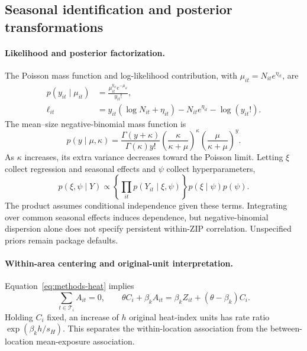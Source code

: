 \documentclass[11pt,letterpaper]{article}
\begin{document}
\subsection{Seasonal identification and posterior transformations}
\label{supp:posterior}
\paragraph{Likelihood and posterior factorization.}
The Poisson mass function and log-likelihood contribution, with \(\mu_{it}=N_{it}e^{\eta_{it}}\), are
\begin{align}
 p(y_{it}\mid\mu_{it})&=\frac{\mu_{it}^{y_{it}}e^{-\mu_{it}}}{y_{it}!},\\
 \ell_{it}&=y_{it}(\log N_{it}+\eta_{it})-N_{it}e^{\eta_{it}}-\log(y_{it}!).
\end{align}
The mean--size negative-binomial mass function is
\begin{equation}
 p(y\mid\mu,\kappa)=\frac{\Gamma(y+\kappa)}{\Gamma(\kappa)y!}
 \left(\frac{\kappa}{\kappa+\mu}\right)^\kappa
 \left(\frac{\mu}{\kappa+\mu}\right)^y.
\end{equation}
As \(\kappa\) increases, its extra variance decreases toward the Poisson limit. Letting \(\xi\) collect regression and seasonal effects and \(\psi\) collect hyperparameters,
\begin{equation}
 p(\xi,\psi\mid Y)\propto
 \left\{\prod_{it}p(Y_{it}\mid\xi,\psi)\right\}p(\xi\mid\psi)p(\psi).
\end{equation}
The product assumes conditional independence given these terms. Integrating over common seasonal effects induces dependence, but negative-binomial dispersion alone does not specify persistent within-ZIP correlation. Unspecified priors remain package defaults.

\paragraph{Within-area centering and original-unit interpretation.}
Equation~\eqref{eq:methods-heat} implies
\begin{equation}
 \sum_{t\in\mathcal T_i}A_{it}=0,\qquad
 \theta C_i+\beta_kA_{it}=\beta_kZ_{it}+(\theta-\beta_k)C_i.
\end{equation}
Holding \(C_i\) fixed, an increase of \(h\) original heat-index units has rate ratio \(\exp(\beta_kh/s_H)\). This separates the within-location association from the between-location mean-exposure association.
\end{document}
